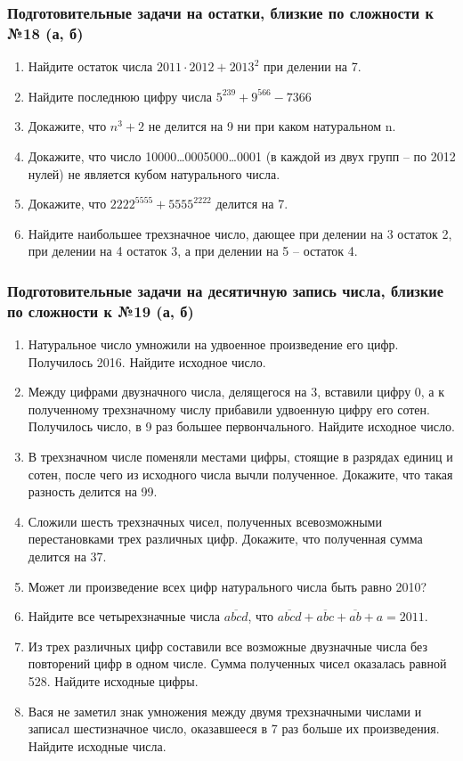 \documentclass[12pt]{article}
\begin{document}
\subsubsection*{Подготовительные задачи на остатки, близкие по сложности к №18 (а, б)}
 \begin{enumerate}[start=1,label={\itshape\bfseries \arabic*.}]
	\item Найдите остаток числа $2011 \cdot 2012 + 2013^2$ при делении на 7.
	\item Найдите последнюю цифру числа $5^{239} + 9^{566} - 7{366}$
	\item Докажите, что $n^3 + 2$ не делится на 9 ни при каком натуральном n.
	\item Докажите, что число 10000\ldots0005000\ldots0001 (в каждой из двух групп -- по 2012 нулей) не является кубом натурального числа.
	\item Докажите, что $2222^{5555} + 5555^{2222}$ делится на 7.
	\item Найдите наибольшее трехзначное число, дающее при делении на 3 остаток 2, при делении на 4 остаток 3, а при делении на 5 -- остаток 4.
\end{enumerate}
\subsubsection*{Подготовительные задачи на десятичную запись числа, близкие по сложности к №19 (а, б)}
 \begin{enumerate}[start=1,label={\itshape\bfseries \arabic*.}]
	\item Натуральное число умножили на удвоенное произведение его цифр. Получилось 2016. Найдите исходное число.
	\item Между цифрами двузначного числа, делящегося на 3, вставили цифру 0, а к полученному трехзначному числу прибавили удвоенную цифру его сотен. Получилось число, в 9 раз большее первончального. Найдите исходное число.
	\item В трехзначном числе поменяли местами цифры, стоящие в разрядах единиц и сотен, после чего из исходного числа вычли полученное. Докажите, что такая разность делится на 99.
	\item Сложили шесть трехзначных чисел, полученных всевозможными перестановками трех различных цифр. Докажите, что полученная сумма делится на 37.
	\item Может ли произведение всех цифр натурального числа быть равно 2010?
	\item Найдите все четырехзначные числа $\overline{abcd}$, что $\overline{abcd} + \overline{abc} + \overline{ab} + a = 2011$.
	\item Из трех различных цифр составили все возможные двузначные числа без повторений цифр в одном числе. Сумма полученных чисел оказалась равной 528. Найдите исходные цифры.
	\item Вася не заметил знак умножения между двумя трехзначными числами и записал шестизначное число, оказавшееся в 7 раз больше их произведения. Найдите исходные числа.
\end{enumerate}
\end{document}

